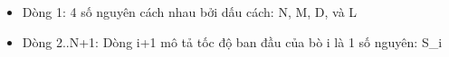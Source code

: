 \begin{itemize}
	\item     Dòng 1: 4 số nguyên cách nhau bởi dấu cách: N, M, D, và L   
	\item     Dòng 2..N+1: Dòng i+1 mô tả tốc độ ban đầu của bò i là 1 số nguyên: S\_i   
\end{itemize}
